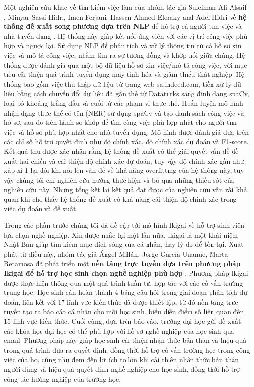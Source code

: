 Một nghiên cứu khác về tìm kiếm việc làm của nhóm tác giả Suleiman Ali Alsaif , Minyar Sassi Hidri, Imen Ferjani, Hassan Ahmed Eleraky and Adel Hidri về \textbf{hệ thống đề xuất song phương dựa trên NLP} để hỗ trợ cả người tìm việc và nhà tuyển dụng \cite{suleiman}. Hệ thống này giúp kết nối ứng viên với các vị trí công việc phù hợp và ngược lại.  Sử dụng NLP để phân tích và xử lý thông tin từ cả hồ sơ xin việc và mô tả công việc, nhằm tìm ra sự tương đồng và khớp nối giữa chúng. Hệ thống được đánh giá qua một bộ dữ liệu hồ sơ xin việc/mô tả công việc, với mục tiêu cải thiện quá trình tuyển dụng máy tính hóa và giảm thiểu thất nghiệp. Hệ thống bao gồm việc thu thập dữ liệu từ trang web sa.indeed.com, tiền xử lý dữ liệu bằng cách chuyển đổi dữ liệu đã gắn thẻ từ Dataturks sang định dạng spaCy, loại bỏ khoảng trắng đầu và cuối từ các phạm vi thực thể. Huấn luyện mô hình nhận dạng thực thể có tên (NER) sử dụng spaCy và tạo danh sách công việc và hồ sơ, sau đó tiến hành so khớp để tìm công việc phù hợp nhất cho người tìm việc và hồ sơ phù hợp nhất cho nhà tuyển dụng. Mô hình được đánh giá dựa trên các chỉ số hỗ trợ quyết định như độ chính xác, độ chính xác dự đoán và F1-score. Kết quả thu được xác nhận rằng hệ thống đề xuất có thể giải quyết vấn đề đề xuất hai chiều và cải thiện độ chính xác dự đoán, tuy vậy độ chính xác gần như xấp xỉ 1 lại đôi khi nói lên vấn đề về khả năng overfitting của hệ thống này, tuy vậy chúng tôi chỉ nghiên cứu hướng thực hiện và bỏ qua những thiếu sót của nghiên cứu này. Nhưng tổng kết lại kết quả đạt được của nghiên cứu vẫn rất khả quan khi  cho thấy hệ thống đề xuất có khả năng cải thiện độ chính xác trong việc dự đoán và đề xuất.

Trong các phần trước chúng tôi đã đề cập tới mô hình Ikigai về hỗ trợ sinh viên lựa chọn nghề nghiệp. Xin được nhắc lại một lần nữa, Ikigai là một khái niệm Nhật Bản giúp tìm kiếm mục đích sống của cá nhân, hay lý do để tồn tại. Xuất phát từ điều này, nhóm tác giả Ángel Millán, Jorge García-Unanue, Marta Retamosa đã phát triển một\textbf{ nền tảng trực tuyến dựa trên phương pháp Ikigai để hỗ trợ học sinh chọn nghề nghiệp phù hợp} \cite{angel}. Phương pháp Ikigai được thực hiện thông qua một quá trình tuần tự, hợp tác với các cố vấn trường trung học. Học sinh cần hoàn thành 4 bảng câu hỏi trong giai đoạn phân tích dự đoán, liên kết với 17 lĩnh vực kiến thức đã được thiết lập, từ đó nền tảng trực tuyến tạo ra báo cáo cá nhân cho mỗi học sinh, biểu diễn điểm số liên quan đến 15 lĩnh vực kiến thức. Cuối cùng, dựa trên báo cáo, trường đại học gửi đề xuất các khóa học đại học có thể phù hợp với hồ sơ nghề nghiệp của học sinh qua email. Phương pháp này giúp học sinh cải thiện nhận thức bản thân và hiệu quả trong quá trình đưa ra quyết định, đồng thời hỗ trợ cố vấn trường học trong công việc của họ, cũng như đem đến lợi ích to lớn khi cải thiện nhận thức bản thân người dùng và hiệu quả quyết định nghề nghiệp cho học sinh, đồng thời hỗ trợ công tác hướng nghiệp của trường học.

